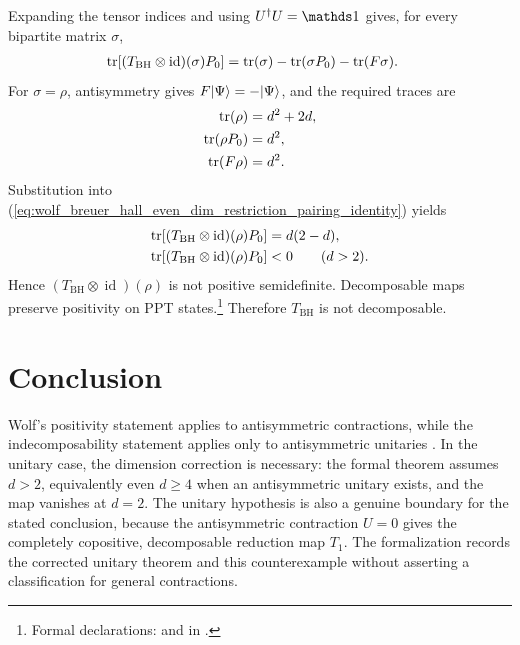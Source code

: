\documentclass{article}
\begin{document}
Expanding the tensor indices and using $U^\dagger U=\Id$ gives, for every
bipartite matrix $\sigma$,
\begin{align}
    \operatorname{tr}\!\left[(T_{\mathrm{BH}}\otimes\operatorname{id})(\sigma)P_0\right]
        &=\operatorname{tr}(\sigma)-\operatorname{tr}(\sigma P_0)-\operatorname{tr}(F\sigma).
    \label{eq:wolf_breuer_hall_even_dim_restriction_pairing_identity}
\end{align}
For $\sigma=\rho$, antisymmetry gives
$F|\Psi\rangle=-|\Psi\rangle$, and the required traces are
\begin{align}
    \operatorname{tr}(\rho)
        &=d^2+2d,
    \label{eq:wolf_breuer_hall_even_dim_restriction_witness_trace}\\
    \operatorname{tr}(\rho P_0)
        &=d^2,
    \label{eq:wolf_breuer_hall_even_dim_restriction_projector_pairing}\\
    \operatorname{tr}(F\rho)
        &=d^2.
    \label{eq:wolf_breuer_hall_even_dim_restriction_swap_pairing}
\end{align}
Substitution into
(\ref{eq:wolf_breuer_hall_even_dim_restriction_pairing_identity}) yields
\begin{align}
    \operatorname{tr}\!\left[(T_{\mathrm{BH}}\otimes\operatorname{id})(\rho)P_0\right]
        &=d(2-d),
    \label{eq:wolf_breuer_hall_even_dim_restriction_negative_detection_value}\\
    \operatorname{tr}\!\left[(T_{\mathrm{BH}}\otimes\operatorname{id})(\rho)P_0\right]
        &<0
        \qquad(d>2).
    \label{eq:wolf_breuer_hall_even_dim_restriction_negative_detection}
\end{align}
Hence $(T_{\mathrm{BH}}\otimes\operatorname{id})(\rho)$ is not positive
semidefinite. Decomposable maps preserve positivity on PPT
states.\footnote{Formal declarations:
 and
in .}
Therefore $T_{\mathrm{BH}}$ is not decomposable.

\section{Conclusion}

Wolf's positivity statement applies to antisymmetric contractions, while the
indecomposability statement applies only to antisymmetric unitaries
\cite[Example~3.1]{Wolf2012Quantum}. In the unitary case, the dimension
correction is necessary: the formal theorem assumes $d>2$, equivalently even
$d\geq4$ when an antisymmetric unitary exists, and the map vanishes at $d=2$.
The unitary hypothesis is also a genuine boundary for the stated conclusion,
because the antisymmetric contraction $U=0$ gives the completely copositive,
decomposable reduction map $T_1$. The formalization records the corrected
unitary theorem and this counterexample without asserting a classification for
general contractions.



\end{document}
